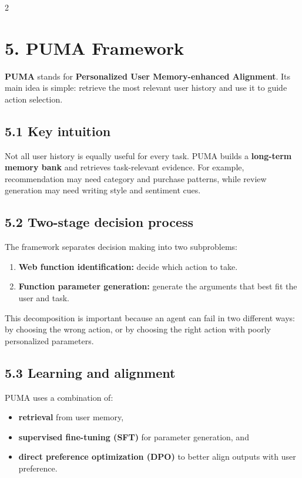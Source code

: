 \documentclass{article}
\begin{document}
\begin{multicols}{2}
\columnbreak%

\section*{5. PUMA Framework}
\textbf{PUMA} stands for \textbf{Personalized User Memory-enhanced Alignment}. Its main idea is simple: retrieve the most relevant user history and use it to guide action selection.

\subsection*{5.1 Key intuition}
Not all user history is equally useful for every task. PUMA builds a \textbf{long-term memory bank} and retrieves task-relevant evidence. For example, recommendation may need category and purchase patterns, while review generation may need writing style and sentiment cues.

\subsection*{5.2 Two-stage decision process}
The framework separates decision making into two subproblems:

\begin{enumerate}[leftmargin=1.3em,itemsep=0.2em,topsep=0.2em]
	\item \textbf{Web function identification:} decide which action to take.
	\item \textbf{Function parameter generation:} generate the arguments that best fit the user and task.
\end{enumerate}

This decomposition is important because an agent can fail in two different ways: by choosing the wrong action, or by choosing the right action with poorly personalized parameters.

\subsection*{5.3 Learning and alignment}
PUMA uses a combination of:
\begin{itemize}[leftmargin=1.1em,itemsep=0.2em,topsep=0.2em]
	\item \textbf{retrieval} from user memory,
	\item \textbf{supervised fine-tuning (SFT)} for parameter generation, and
	\item \textbf{direct preference optimization (DPO)} to better align outputs with user preference.
\end{itemize}


\end{multicols}
\end{document}
